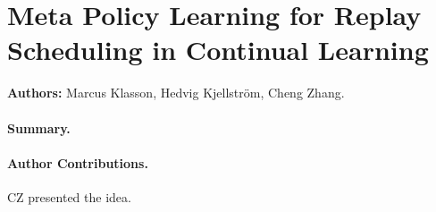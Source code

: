 
\section{Meta Policy Learning for Replay Scheduling in Continual Learning}
\label{sec:paperD}

\textbf{Authors:} Marcus Klasson, Hedvig Kjellström, Cheng Zhang. 

\paragraph{Summary.} 



\paragraph{Author Contributions.} CZ presented the idea. 
